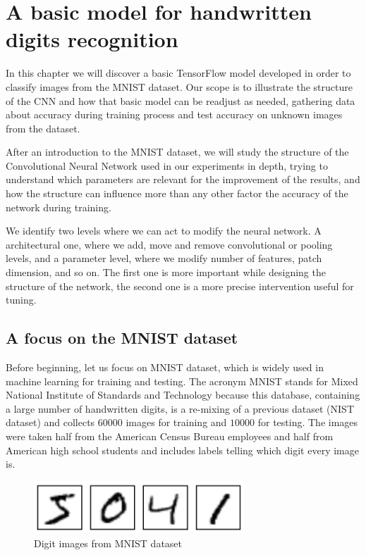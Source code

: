 \chapter{A basic model for handwritten digits recognition}\label{ch:basic_tf_model}

In this chapter we will discover a basic TensorFlow model developed in order to classify images from the \acs{MNIST} dataset. Our scope is to illustrate the structure of the \acs{CNN} and how that basic model can be readjust as needed, gathering data about accuracy during training process and test accuracy on unknown images from the dataset.

After an introduction to the \acs{MNIST} dataset, we will study the structure of the Convolutional Neural Network used in our experiments in depth, trying to understand which parameters are relevant for the improvement of the results, and how the structure can influence more than any other factor the accuracy of the network during training.

We identify two levels where we can act to modify the neural network. A architectural one, where we add, move and remove convolutional or pooling levels, and a parameter level, where we modify number of features, patch dimension, and so on. The first one is more important while designing the structure of the network, the second one is a more precise intervention useful for tuning.

\section{A focus on the MNIST dataset}

Before beginning, let us focus on \acs{MNIST} dataset, which is widely used in machine learning for training and testing. The acronym \acs{MNIST} stands for Mixed National Institute of Standards and Technology because this database, containing a large number of handwritten digits, is a re-mixing of a previous dataset (NIST dataset) and collects $60000$ images for training and $10000$ for testing. The images were taken half from the American Census Bureau employees and half from American high school students and includes labels telling which digit every image is.

\begin{figure}
	\centering
	\includegraphics[width=0.7\textwidth]{Images/MNIST_images}
	\caption{Digit images from \acs{MNIST} dataset}
	\label{fig:MNIST_images}
\end{figure}

